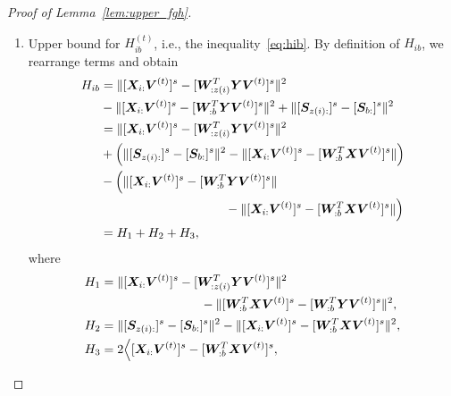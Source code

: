 \documentclass[journal]{IEEEtran}
\theoremstyle{definition}
\theoremstyle{definition}
\newcommand{\of}[1]{\left(#1\right)}
\begin{document}
\begin{proof}[Proof of Lemma~\ref{lem:upper_fgh}]
\begin{enumerate}[wide]
    Choose the $\tilde C$ such that
    \begin{equation}\label{eq:tilde_c1}
        3 \of{  C^4 \frac{\bar C}{\tilde C^3}  + \frac{C'}{\tilde C^2} + \frac{C^2 \bar C^2}{\tilde C} + \frac{C^3 C' \bar C^2}{\tilde C^2 }} \leq \frac{1}{512}.
    \end{equation}
    Then,  we finish the proof of inequality~\eqref{eq:gib} by plugging the inequalities~\eqref{eq:g1}, \eqref{eq:g2}, and \eqref{eq:g3} into the upper bound~\eqref{eq:gib_decomp}.  
    
    \item Upper bound for $H_{ib}^{(t)}$, i.e., the inequality~\eqref{eq:hib}. By definition of $H_{ib}$, we rearrange terms and obtain
    \small
    \begin{align}
        H_{ib} &= \onormSize{}{ [\mX_{i:} \mV^{(t)}]^s -  [  \mW_{:z(i)}^T \mY \mV^{(t)} ]^s}^2 \\
        & - \onormSize{}{ [\mX_{i:} \mV^{(t)}]^s -  [  \mW_{:b}^T \mY \mV^{(t)} ]^s}^2 + \onormSize{}{ [ \mS_{z(i):}  ]^s - [ \mS_{b:}  ]^s  }^2 \\
        & =  \onormSize{}{ [ \mX_{i:} \mV^{(t)}]^s -  [  \mW_{:z(i)}^T \mY \mV^{(t)} ]^s}^2 \\
        &  + \of{ \onormSize{}{ [ \mS_{z(i):}  ]^s - [ \mS_{b:}  ]^s  }^2 - \onormSize{}{ [\mX_{i:} \mV^{(t)}]^s-  [  \mW_{:b}^T \mX \mV^{(t)} ]^s }  } \\
        &  - \Big(\onormSize{}{ [\mX_{i:} \mV^{(t)}]^s-  [  \mW_{:b}^T \mY \mV^{(t)} ]^s } \\
        & \quad \quad \quad \quad \quad \quad \quad \quad \quad \quad -  \onormSize{}{ [\mX_{i:} \mV^{(t)}]^s-  [  \mW_{:b}^T \mX \mV^{(t)} ]^s }   \Big) \\
        & = H_1 + H_2 + H_3,
    \end{align}
    \normalsize
    where 
    \small
    \begin{align}
        H_1 &= \onormSize{}{ [ \mX_{i:} \mV^{(t)}]^s -  [  \mW_{:z(i)}^T \mY \mV^{(t)} ]^s}^2 \\
        & \quad \quad \quad \quad \quad  \quad \quad \quad - \onormSize{}{ [ \mW_{:b}^T \mX \mV^{(t)}]^s -  [ \mW_{:b}^T \mY \mV^{(t)}]^s}^2, \\
        H_2 &=  \onormSize{}{ [ \mS_{z(i):}  ]^s - [ \mS_{b:}  ]^s  }^2 - \onormSize{}{ [\mX_{i:} \mV^{(t)}]^s-  [  \mW_{:b}^T \mX \mV^{(t)} ]^s }^2  , \\
        H_3 & = 2 \Big\langle [\mX_{i:} \mV^{(t)}]^s  -  [  \mW_{:b}^T \mX \mV^{(t)} ]^s, \\

\end{align}
\end{enumerate}
\end{proof}
\end{document}
